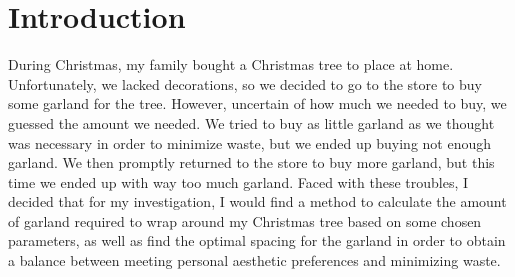 \section*{Introduction}
During Christmas, my family bought a Christmas tree to place at home. Unfortunately, we lacked decorations, so we decided to go to the store to buy some garland for the tree. However, uncertain of how much we needed to buy, we guessed the amount we needed. We tried to buy as little garland as we thought was necessary in order to minimize waste, but we ended up buying not enough garland. We then promptly returned to the store to buy more garland, but this time we ended up with way too much garland. Faced with these troubles, I decided that for my investigation, I would find a method to calculate the amount of garland required to wrap around my Christmas tree based on some chosen parameters, as well as find the optimal spacing for the garland in order to obtain a balance between meeting personal aesthetic preferences and minimizing waste.
